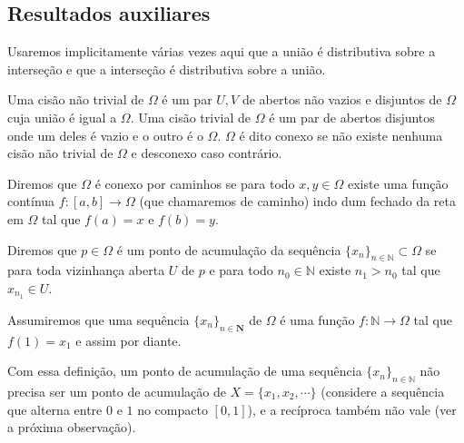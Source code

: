 


\begin{center}
\tableofcontents
\end{center}
\newpage
{}



\subsection{Resultados auxiliares}
\begin{oobs}
Usaremos implicitamente várias vezes aqui que a união é distributiva sobre a interseção e que a interseção é distributiva sobre a união.
\end{oobs}
\begin{deff}
Uma cisão não trivial de $\Omega$ é um par $U, V$ de abertos não vazios e disjuntos de $\Omega$ cuja união é igual a $\Omega$. Uma cisão trivial de $\Omega$ é um par de abertos disjuntos onde um deles é vazio e o outro é o $\Omega$. $\Omega$ é dito conexo se não existe nenhuma cisão não trivial de $\Omega$ e desconexo caso contrário.
\end{deff}
\begin{deff}
Diremos que $\Omega$ é conexo por caminhos se para todo $x, y \in \Omega$ existe uma função contínua $f: [a,b] \to \Omega$ (que chamaremos de caminho) indo dum fechado da reta em $\Omega$ tal que $f(a) = x$ e $f(b) = y$.
\end{deff}
\begin{deff}
Diremos que $p \in \Omega$ é um ponto de acumulação da sequência $\{x_n \}_{n \in \mathbb{N}} \subset \Omega$ se para toda vizinhança aberta $U$ de $p$ e para todo $n_0 \in \mathbb{N}$ existe $n_1 > n_0$ tal que $x_{n_1} \in U$.
\begin{oobs}
Assumiremos que uma sequência $\{x_n \}_{n \in \mathbf{N}}$ de $\Omega$ é uma função $f: \mathbb{N} \to \Omega$ tal que $f(1) = x_1$ e assim por diante.
\end{oobs}
\begin{oobs}
Com essa definição, um ponto de acumulação de uma sequência $\{x_n \}_{n \in \mathbb{N}}$ não precisa ser um ponto de acumulação de $X = \{x_1, x_2, \cdots \}$ (considere a sequência que alterna entre $0$ e $1$ no compacto $[0,1]$), e a recíproca também não vale (ver a próxima observação).
\end{oobs}

\end{deff}
